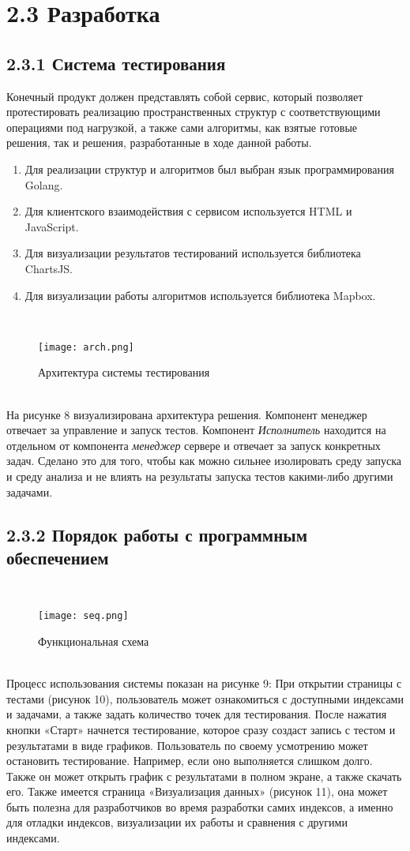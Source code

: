 \section{2.3 Разработка}
\label{cha:development}

\subsection{2.3.1 Система тестирования}
Конечный продукт должен представлять собой сервис, который позволяет протестировать реализацию пространственных структур с соответствующими операциями под нагрузкой, а также сами алгоритмы, как взятые готовые решения, так и решения, разработанные в ходе данной работы. 
\begin{enumerate}
    \item Для реализации структур и алгоритмов был выбран язык программирования Golang.  
    \item Для клиентского взаимодействия с сервисом используется HTML и JavaScript.
    \item Для визуализации результатов тестирований используется библиотека ChartsJS.
    \item Для визуализации работы алгоритмов используется библиотека Mapbox.
\end{enumerate}
  \\
\begin{figure}[h]
    \centering
    \texttt{[image: arch.png]}
    \caption{Архитектура системы тестирования}
\end{figure}
  \\
На рисунке 8 визуализирована архитектура решения. Компонент менеджер отвечает за управление и запуск тестов. Компонент \textit{Исполнитель} находится на отдельном от компонента \textit{менеджер} сервере и отвечает за запуск конкретных задач. Сделано это для того, чтобы как можно сильнее изолировать среду запуска и среду анализа и не влиять на результаты запуска тестов какими-либо другими задачами. 


\subsection{2.3.2 Порядок работы с программным обеспечением}
  \\
\begin{figure}[h]
    \centering
    \texttt{[image: seq.png]}
    \caption{Функциональная схема}
\end{figure}
  \\
Процесс использования системы показан на рисунке 9: При открытии страницы с тестами (рисунок 10), пользователь может ознакомиться с доступными индексами и задачами, а также задать количество точек для тестирования. После нажатия кнопки «Старт» начнется тестирование, которое сразу создаст запись с тестом и результатами в виде графиков. 
Пользователь по своему усмотрению может остановить тестирование. Например, если оно выполняется слишком долго. Также он может открыть график с результатами в полном экране, а также скачать его. 
Также имеется страница «Визуализация данных» (рисунок 11), она может быть полезна для разработчиков во время разработки самих индексов, а именно для отладки индексов, визуализации их работы и сравнения с другими индексами. 

